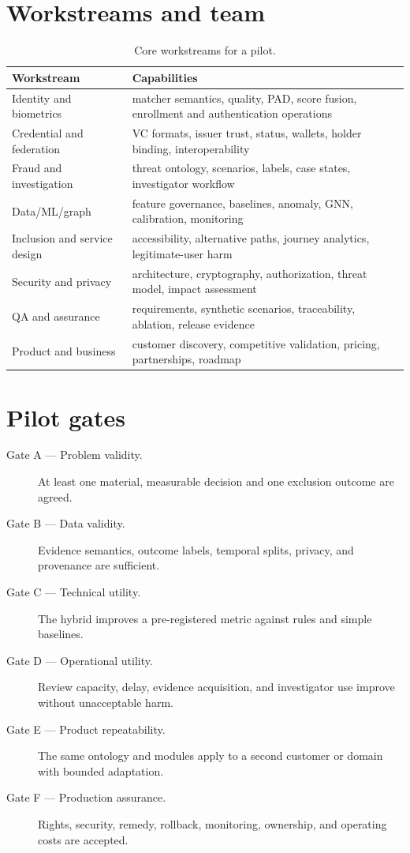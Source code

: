 \section{Workstreams and team}

\begin{table}[htbp]
\centering
\caption{Core workstreams for a pilot.}
\begin{tabularx}{\textwidth}{p{36mm}Y}
\toprule
Workstream & Capabilities\\
\midrule
Identity and biometrics & matcher semantics, quality, PAD, score fusion, enrollment and authentication operations\\
Credential and federation & VC formats, issuer trust, status, wallets, holder binding, interoperability\\
Fraud and investigation & threat ontology, scenarios, labels, case states, investigator workflow\\
Data/ML/graph & feature governance, baselines, anomaly, GNN, calibration, monitoring\\
Inclusion and service design & accessibility, alternative paths, journey analytics, legitimate-user harm\\
Security and privacy & architecture, cryptography, authorization, threat model, impact assessment\\
QA and assurance & requirements, synthetic scenarios, traceability, ablation, release evidence\\
Product and business & customer discovery, competitive validation, pricing, partnerships, roadmap\\
\bottomrule
\end{tabularx}
\end{table}

\section{Pilot gates}

\begin{description}
\item[Gate A --- Problem validity.] At least one material, measurable decision and one exclusion outcome are agreed.
\item[Gate B --- Data validity.] Evidence semantics, outcome labels, temporal splits, privacy, and provenance are sufficient.
\item[Gate C --- Technical utility.] The hybrid improves a pre-registered metric against rules and simple baselines.
\item[Gate D --- Operational utility.] Review capacity, delay, evidence acquisition, and investigator use improve without unacceptable harm.
\item[Gate E --- Product repeatability.] The same ontology and modules apply to a second customer or domain with bounded adaptation.
\item[Gate F --- Production assurance.] Rights, security, remedy, rollback, monitoring, ownership, and operating costs are accepted.
\end{description}

